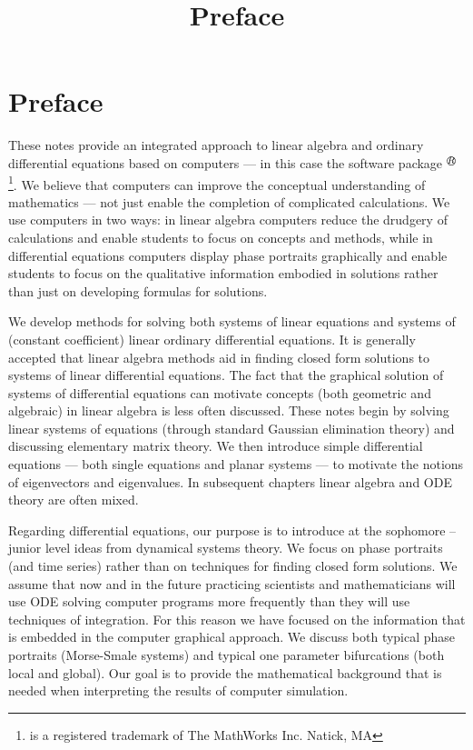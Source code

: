 \documentclass{ximera}
\title{Preface}
\begin{document}
\begin{abstract}
\end{abstract}
\maketitle

\section*{Preface}

These notes provide an integrated approach to linear algebra and ordinary 
differential equations based on computers --- in this case the software 
package \Matlabp$^{R\!\!\!\!\!\bigcirc}$ \footnote{\Matlab is a registered trademark
of The MathWorks Inc. Natick, MA}.   We believe that computers can improve 
the conceptual understanding of mathematics --- not just enable the 
completion of complicated calculations.  We use computers in two ways:  in 
linear algebra computers reduce the drudgery of calculations and 
enable students to focus on concepts and methods, while in differential 
equations computers display phase portraits graphically and enable 
students to focus on the qualitative information embodied in solutions 
rather than just on developing formulas for solutions.

We develop methods for solving both systems of linear 
equations and systems of (constant coefficient) linear ordinary 
differential equations.  It is generally accepted that linear algebra 
methods aid in finding closed form solutions to systems of linear 
differential equations.  The fact that the graphical solution of systems 
of differential equations can motivate concepts (both geometric and algebraic)
in linear algebra is less often discussed.  These notes begin by solving linear 
systems of equations (through standard Gaussian elimination theory) and 
discussing elementary matrix theory.  We then introduce simple differential 
equations --- both single equations and planar systems --- to motivate the 
notions of eigenvectors and eigenvalues. In subsequent chapters linear algebra 
and ODE theory are often mixed.  

Regarding differential equations, our purpose is to introduce at the 
sophomore -- junior level ideas from dynamical systems theory.  We focus on 
phase portraits (and time series) rather than on techniques for finding
closed form solutions.  We assume that now and in the future practicing
scientists and mathematicians will use ODE solving computer programs
more frequently than they will use techniques of integration.  For this
reason we have focused on the information that is embedded in the computer  
graphical approach.  We discuss both typical phase portraits
(Morse-Smale systems) and typical one parameter bifurcations (both local 
and global).   Our goal is to provide the mathematical background that is
needed when interpreting the results of computer simulation.
\end{document}
